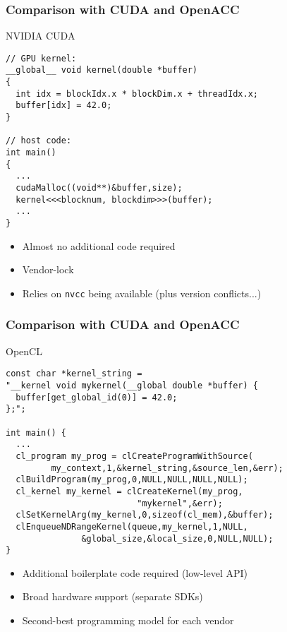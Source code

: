 


\begin{frame}[fragile]
\frametitle{Comparison with CUDA and OpenACC}
 \begin{block}{NVIDIA CUDA}
  \begin{lstlisting}
// GPU kernel:
__global__ void kernel(double *buffer)
{
  int idx = blockIdx.x * blockDim.x + threadIdx.x;
  buffer[idx] = 42.0;
}

// host code:
int main()
{ 
  ...
  cudaMalloc((void**)&buffer,size);
  kernel<<<blocknum, blockdim>>>(buffer);
  ...
}
  \end{lstlisting} 

  \begin{itemize}
   \item Almost no additional code required
   \item Vendor-lock
   \item Relies on \lstinline|nvcc| being available (plus version conflicts...)
  \end{itemize}
 \end{block}

\end{frame}



\begin{frame}[fragile]
\frametitle{Comparison with CUDA and OpenACC}
 \begin{block}{OpenCL}
  \begin{lstlisting}
const char *kernel_string =
"__kernel void mykernel(__global double *buffer) {
  buffer[get_global_id(0)] = 42.0;
};";   

int main() {
  ...
  cl_program my_prog = clCreateProgramWithSource(
         my_context,1,&kernel_string,&source_len,&err);
  clBuildProgram(my_prog,0,NULL,NULL,NULL,NULL);
  cl_kernel my_kernel = clCreateKernel(my_prog,
                          "mykernel",&err);
  clSetKernelArg(my_kernel,0,sizeof(cl_mem),&buffer);
  clEnqueueNDRangeKernel(queue,my_kernel,1,NULL,
               &global_size,&local_size,0,NULL,NULL);
} 
  \end{lstlisting} 

  \begin{itemize}
   \item Additional boilerplate code required (low-level API)
   \item Broad hardware support (separate SDKs)
   \item Second-best programming model for each vendor
  \end{itemize}
 \end{block}

\end{frame}






